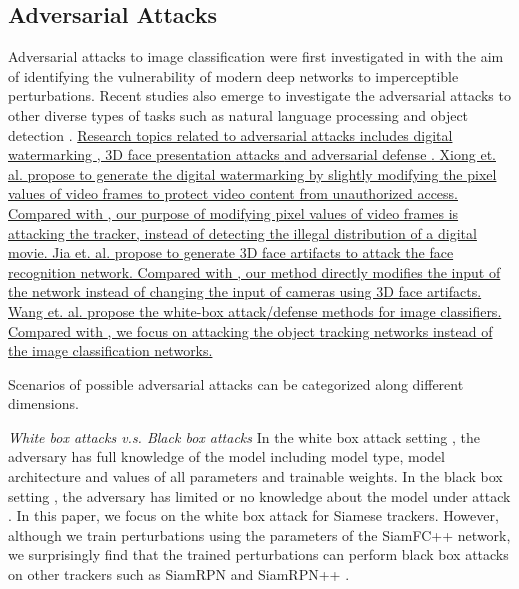 \documentclass[journal]{IEEEtran}
\begin{document}
\subsection{Adversarial Attacks}

Adversarial attacks \cite{9169672} to image classification were first investigated in \cite{intriguing} with the aim of identifying the vulnerability of modern deep networks to imperceptible perturbations. 
Recent studies also emerge to investigate the adversarial attacks to other diverse types of tasks such as natural language processing \cite{generating,zhang2020adversarial,morris2020textattack,jin2020bert} and object detection \cite{wei2019transferable}.
\uline{
Research topics related to adversarial attacks includes digital watermarking \cite{9343885}, 3D face presentation attacks \cite{9294085} and adversarial defense \cite{9169672}.
Xiong et. al. \cite{9343885} propose to generate the digital watermarking by slightly modifying the pixel values of video frames to protect video content from unauthorized access. Compared with \cite{9343885}, our purpose of modifying pixel values of video frames is attacking the tracker, instead of detecting the illegal distribution of a digital movie.
Jia et. al. \cite{9294085} propose to generate 3D face artifacts to attack the face recognition network. Compared with \cite{9294085}, our method directly modifies the input of the network instead of changing the input of cameras using 3D face artifacts.
Wang et. al. \cite{9169672} propose the white-box attack/defense methods for image classifiers. Compared with \cite{9169672}, we focus on attacking the object tracking networks instead of the image classification networks.
}

Scenarios of possible adversarial attacks can be categorized along different dimensions.

\textit{White box attacks v.s. Black box attacks} In the white box attack setting \cite{meng2019white}, the adversary has full knowledge of the model including model type, model architecture and values of all parameters and trainable weights. In the black box setting \cite{cheng2018query,li2019nattack,papernot2017practical,li2020projection}, the adversary has limited or no knowledge about the model under attack \cite{kurakin2018adversarial}. In this paper, we focus on the white box attack for Siamese trackers. However, although we train perturbations using the parameters of the SiamFC++ \cite{SiamFC++} network, we surprisingly find that the trained perturbations can perform black box attacks on other trackers such as SiamRPN \cite{SiamRPN} and SiamRPN++ \cite{SiamRPN++}.
\end{document}
